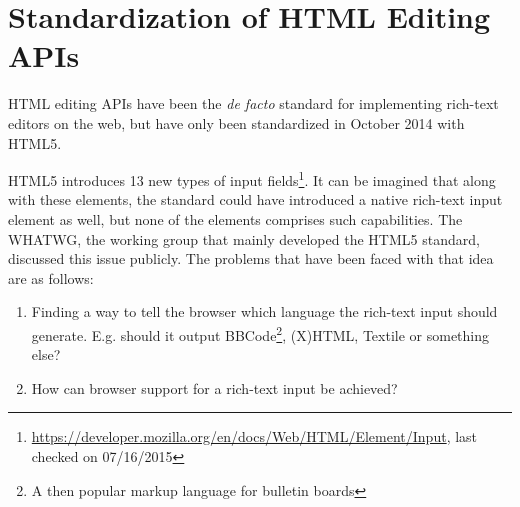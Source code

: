 
\section{Standardization of HTML Editing APIs}
\label{sec:standardization-of-html-editing-apis}





HTML editing APIs have been the \textit{de facto} standard for implementing rich-text editors on the web, but have only been standardized in October 2014 with HTML5. 

HTML5 introduces 13 new types of input fields\footnote{\url{https://developer.mozilla.org/en/docs/Web/HTML/Element/Input}, last checked on 07/16/2015}. It can be imagined that along with these elements, the standard could have introduced a native rich-text input element as well, but none of the elements comprises such capabilities. The WHATWG, the working group that mainly developed the HTML5 standard, discussed this issue publicly. The problems that have been faced with that idea are as follows:


\begin{enumerate} 
\item Finding a way to tell the browser which language the rich-text input should generate. E.g. should it output BBCode\footnote{A then popular markup language for bulletin boards}, (X)HTML, Textile or something else?
\item How can browser support for a rich-text input be achieved?
\end{enumerate}

